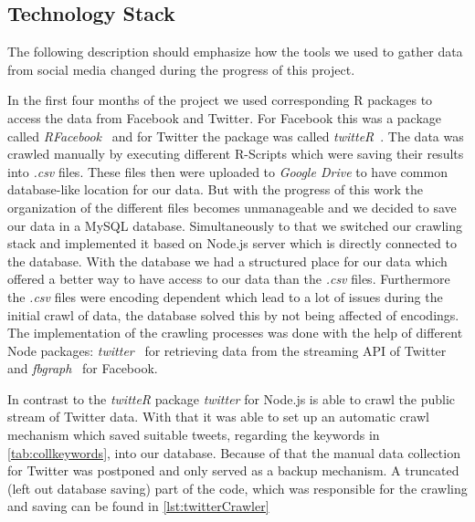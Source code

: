 \documentclass[11pt,titlepage,oneside,openany]{book}
\begin{document}
\subsection{Technology Stack}
\label{sec:datatechstack}

The following description should emphasize how the tools we used to gather data from social media changed during the progress of this project.

In the first four months of the project we used corresponding R packages to access the data from Facebook and Twitter. For Facebook this was a package called \textit{RFacebook}~\cite{Barbera2017-05-25} and for Twitter the package was called \textit{twitteR}~\cite{Grentry2015-07-29}. The data was crawled manually by executing different R-Scripts which were saving their results into \textit{.csv} files. These files then were uploaded to \textit{Google Drive} to have common database-like location for our data. But with the progress of this work the organization of the different files becomes unmanageable and we decided to save our data in a MySQL database.
Simultaneously to that we switched our crawling stack and implemented it based on Node.js server which is directly connected to the database. With the database we had a structured place for our data which offered a better way to have access to our data than the \textit{.csv} files. Furthermore the \textit{.csv} files were encoding dependent which lead to a lot of issues during the initial crawl of data, the database solved this by not being affected of encodings.
The implementation of the crawling processes was done with the help of different Node packages: \textit{twitter}~\cite{Morris2017-01-13} for retrieving data from the streaming API of Twitter and \textit{fbgraph}~\cite{Oliveira2017-01-19} for Facebook. 

In contrast to the \textit{twitteR} package \textit{twitter} for Node.js is able to crawl the public stream of Twitter data. With that it was able to set up an automatic crawl mechanism which saved suitable tweets, regarding the keywords in \autoref{tab:collkeywords}, into our database. Because of that the manual data collection for Twitter was postponed and only served as a backup mechanism. A truncated (left out database saving) part of the code, which was responsible for the crawling and saving can be found in \autoref{lst:twitterCrawler} 
\end{document}
